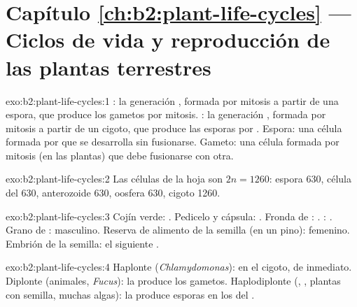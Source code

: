 \section*{Capítulo \ref{ch:b2:plant-life-cycles} --- Ciclos de vida y reproducción de las plantas terrestres}

\begin{solution}{exo:b2:plant-life-cycles:1}
: la generación  , formada por mitosis a
partir de una espora, que produce los gametos por mitosis. : la
generación , formada por mitosis a partir de un cigoto, que
produce las esporas por . Espora: una célula  formada por
 que se desarrolla sin fusionarse. Gameto: una célula 
formada por mitosis (en las plantas) que debe fusionarse con otra.
\end{solution}

\begin{solution}{exo:b2:plant-life-cycles:2}
Las células de la hoja son $2n = 1260$: espora 630, célula del 
630, anterozoide 630, oosfera 630, cigoto 1260.
\end{solution}

\begin{solution}{exo:b2:plant-life-cycles:3}
Cojín verde: . Pedicelo y cápsula: . Fronda de
: . : . Grano de : 
masculino. Reserva de alimento de la semilla (en un pino): 
femenino. Embrión de la semilla: el siguiente .
\end{solution}

\begin{solution}{exo:b2:plant-life-cycles:4}
Haplonte (\emph{Chlamydomonas}):  en el cigoto, de inmediato.
Diplonte (animales, \emph{Fucus}): la  produce los gametos.
Haplodiplonte (, , plantas con semilla, muchas algas): la
 produce esporas en los  del .
\end{solution}

